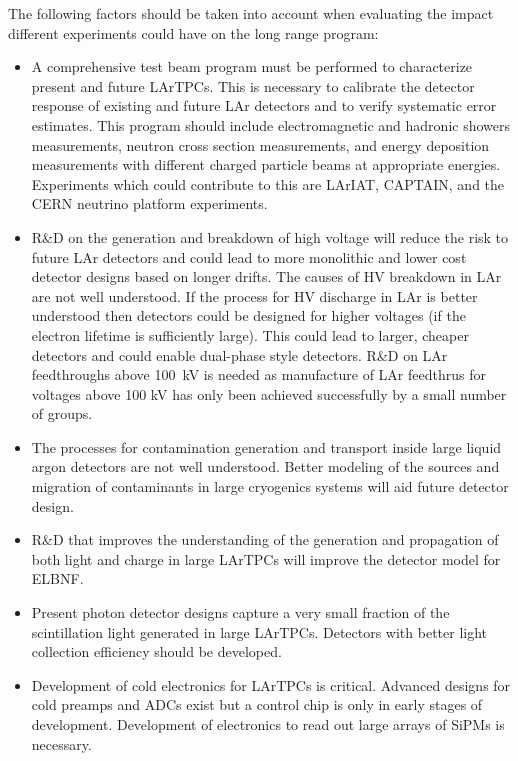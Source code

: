 The following factors should be taken into account when evaluating the
impact different experiments could have on the long range program:
\begin{itemize}

\item A comprehensive test beam program must be performed to
  characterize present and future LArTPCs. This is necessary to
  calibrate the detector response of existing and future LAr detectors
  and to verify systematic error estimates. This program should
  include electromagnetic and hadronic showers measurements, neutron
  cross section measurements, and energy deposition measurements with
  different charged particle beams at appropriate
  energies. Experiments which could contribute to this are LArIAT,
  CAPTAIN, and the CERN neutrino platform experiments.

\item R\&D on the generation and breakdown of high voltage will reduce
  the risk to future LAr detectors and could lead to more monolithic
  and lower cost detector designs based on longer drifts. The causes
  of HV breakdown in LAr are not well understood. If the process for
  HV discharge in LAr is better understood then detectors could be
  designed for higher voltages (if the electron lifetime is
  sufficiently large). This could lead to larger, cheaper detectors
  and could enable dual-phase style detectors. R\&D on LAr
  feedthroughs above 100~kV is needed as manufacture of LAr feedthrus
  for voltages above 100 kV has only been achieved successfully by a
  small number of groups.

\item The processes for contamination generation and transport inside
  large liquid argon detectors are not well understood. Better
  modeling of the sources and migration of contaminants in large
  cryogenics systems will aid future detector design.

\item R\&D that improves the understanding of the generation and
  propagation of both light and charge in large LArTPCs will improve
  the detector model for ELBNF.
 
\item Present photon detector designs capture a very small fraction of
  the scintillation light generated in large LArTPCs. Detectors with
  better light collection efficiency should be developed.

\item Development of cold electronics for LArTPCs is
  critical. Advanced designs for cold preamps and ADCs exist but a
  control chip is only in early stages of development. Development of
  electronics to read out large arrays of SiPMs is necessary.

\end{itemize}




